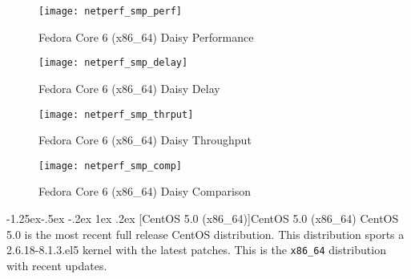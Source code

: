 \documentclass[letterpaper,final,notitlepage,twocolumn,10pt,twoside]{article}
\makeatletter
\renewcommand\subsubsection{\@startsection{subsubsection}{3}{\z@}%
                                     {-1.25ex\@plus -.5ex \@minus -.2ex}%
                                     {1ex \@plus .2ex}%
                                     {\normalfont\normalsize\bfseries}}
\makeatother
\begin{document}
\begin{figure}[p]
\center\texttt{[image: netperf\_smp\_perf]}
\caption[Fedora Core 6 (x86\_64) Daisy Performance]{Fedora Core 6 (x86\_64) Daisy Performance}
\label{figure:smpperf}
\end{figure}

\begin{figure}[p]
\center\texttt{[image: netperf\_smp\_delay]}
\caption[Fedora Core 6 (x86\_64) Daisy Delay]{Fedora Core 6 (x86\_64) Daisy Delay}
\label{figure:smpdly}
\end{figure}

\begin{figure}[p]
\center\texttt{[image: netperf\_smp\_thrput]}
\caption[Fedora Core 6 (x86\_64) Daisy Throughput]{Fedora Core 6 (x86\_64) Daisy Throughput}
\label{figure:smpthrput}
\end{figure}

\begin{figure}[p]
\center\texttt{[image: netperf\_smp\_comp]}
\caption[Fedora Core 6 (x86\_64) Daisy Comparison]{Fedora Core 6 (x86\_64) Daisy Comparison}
\label{figure:smpcomp}
\end{figure}

\subsubsection[CentOS 5.0 (x86\_64)]{CentOS 5.0 (x86\_64)}
CentOS 5.0 is the most recent full release CentOS distribution.  This
distribution sports a 2.6.18-8.1.3.el5 kernel with the latest patches.  This is the
\texttt{x86\_64} distribution with recent updates.
\end{document}
